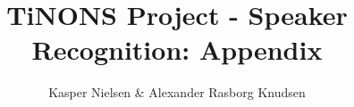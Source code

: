 \documentclass[]{report}
\title{TiNONS Project - Speaker Recognition: Appendix}
\author{Kasper Nielsen \& Alexander Rasborg Knudsen}
\begin{document}
\maketitle

\listoffixmes














\end{document}
